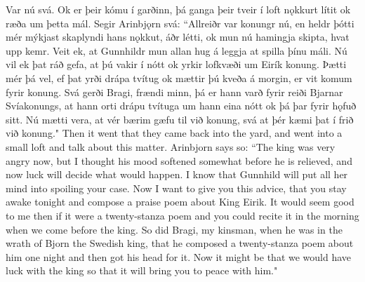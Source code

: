 \begin{paracol}{2}
    Var nú svá. Ok er þeir kómu í garðinn, þá ganga þeir tveir í loft nǫkkurt lítit ok ræða um þetta mál. Segir Arinbjǫrn svá: ``Allreiðr var konungr nú, en heldr þótti mér mýkjast skaplyndi hans nǫkkut, áðr létti, ok mun nú hamingja skipta, hvat upp kemr. Veit ek, at Gunnhildr mun allan hug á leggja at spilla þínu máli. Nú vil ek þat ráð gefa, at þú vakir í nótt ok yrkir lofkvæði um Eirík konung. Þætti mér þá vel, ef þat yrði drápa tvítug ok mættir þú kveða á morgin, er vit komum fyrir konung. Svá gerði Bragi, frændi minn, þá er hann varð fyrir reiði Bjarnar Svíakonungs, at hann orti drápu tvítuga um hann eina nótt ok þá þar fyrir hǫfuð sitt. Nú mætti vera, at vér bærim gæfu til við konung, svá at þér kæmi þat í frið við konung."
    \switchcolumn
    Then it went that they came back into the yard, and went into a small loft and talk about this matter. Arinbjorn says so: ``The king was very angry now, but I thought his mood softened somewhat before he is relieved, and now luck will decide what would happen. I know that Gunnhild will put all her mind into spoiling your case. Now I want to give you this advice, that you stay awake tonight and compose a praise poem about King Eirik. It would seem good to me then if it were a twenty-stanza poem and you could recite it in the morning when we come before the king. So did Bragi, my kinsman, when he was in the wrath of Bjorn the Swedish king, that he composed a twenty-stanza poem about him one night and then got his head for it. Now it might be that we would have luck with the king so that it will bring you to peace with him."
\end{paracol}

